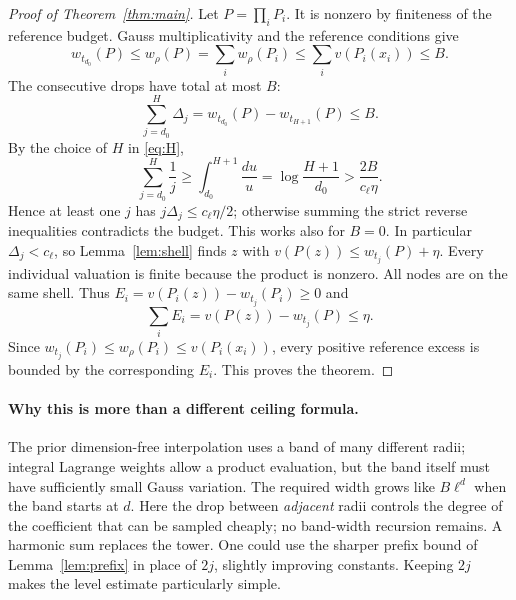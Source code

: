 \documentclass[11pt]{article}
\begin{document}
\begin{proof}[Proof of Theorem~\ref{thm:main}]
Let $P=\prod_i P_i$. It is nonzero by finiteness of the reference budget. Gauss multiplicativity and the reference conditions give
\[
 w_{t_{d_0}}(P)\le w_\rho(P)=\sum_i w_\rho(P_i)
 \le\sum_i v(P_i(x_i))\le B.
\]
The consecutive drops have total at most $B$:
\[
 \sum_{j=d_0}^{H}\Delta_j=w_{t_{d_0}}(P)-w_{t_{H+1}}(P)\le B.
\]
By the choice of $H$ in \eqref{eq:H},
\[
 \sum_{j=d_0}^{H}\frac1j\ge\int_{d_0}^{H+1}\frac{du}{u}
 =\log\frac{H+1}{d_0}>\frac{2B}{c_\ell\eta}.
\]
Hence at least one $j$ has $j\Delta_j\le c_\ell\eta/2$; otherwise summing the strict reverse inequalities contradicts the budget. This works also for $B=0$. In particular $\Delta_j<c_\ell$, so Lemma~\ref{lem:shell} finds $z$ with $v(P(z))\le w_{t_j}(P)+\eta$. Every individual valuation is finite because the product is nonzero. All nodes are on the same shell. Thus $E_i=v(P_i(z))-w_{t_j}(P_i)\ge0$ and
\[
 \sum_i E_i=v(P(z))-w_{t_j}(P)\le\eta.
\]
Since $w_{t_j}(P_i)\le w_\rho(P_i)\le v(P_i(x_i))$, every positive reference excess is bounded by the corresponding $E_i$. This proves the theorem.
\end{proof}

\paragraph{Why this is more than a different ceiling formula.}
The prior dimension-free interpolation uses a band of many different radii; integral Lagrange weights allow a product evaluation, but the band itself must have sufficiently small Gauss variation. The required width grows like $B\ell^d$ when the band starts at $d$. Here the drop between \emph{adjacent} radii controls the degree of the coefficient that can be sampled cheaply; no band-width recursion remains. A harmonic sum replaces the tower. One could use the sharper prefix bound of Lemma~\ref{lem:prefix} in place of $2j$, slightly improving constants. Keeping $2j$ makes the level estimate particularly simple.
\end{document}
